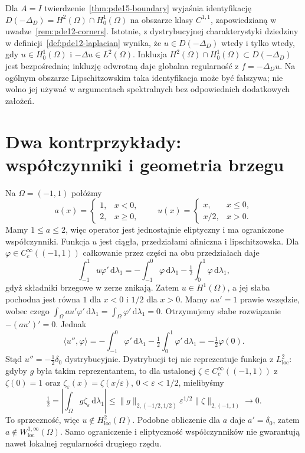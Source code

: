 \begin{uwaga}
Dla $A=I$ twierdzenie~\ref{thm:pde15-boundary}
wyjaśnia identyfikację $D(-\Delta_D)=H^2(\Omega)\cap
H_0^1(\Omega)$ na obszarze klasy $C^{1,1}$, zapowiedzianą
w uwadze~\ref{rem:pde12-corners}.
Istotnie, z dystrybucyjnej charakterystyki dziedziny
w definicji~\ref{def:pde12-laplacian} wynika, że
$u\in D(-\Delta_D)$ wtedy i tylko wtedy, gdy
$u\in H_0^1(\Omega)$ i $-\Delta u\in L^2(\Omega)$.
Inkluzja $H^2(\Omega)\cap H_0^1(\Omega)\subset D(-\Delta_D)$
jest bezpośrednia; inkluzję odwrotną daje globalna
regularność z $f=-\Delta_Du$.
Na ogólnym obszarze Lipschitzowskim taka identyfikacja
może być fałszywa; nie wolno jej używać w argumentach
spektralnych bez odpowiednich dodatkowych założeń.
\end{uwaga}

\section{Dwa kontrprzykłady: współczynniki i geometria brzegu}
\label{sec:pde15-counterexamples}
\begin{kontrprzyklad}
\label{ex:pde15-jump}
Na $\Omega=(-1,1)$ połóżmy
\[
 a(x)=\begin{cases}1,&x<0,\\2,&x\ge0,\end{cases}
 \qquad
 u(x)=\begin{cases}x,&x\le0,\\x/2,&x>0.\end{cases}
\]
Mamy $1\le a\le2$, więc operator jest jednostajnie
eliptyczny i ma ograniczone współczynniki.
Funkcja $u$ jest ciągła, przedziałami afiniczna
i lipschitzowska. Dla $\varphi\in C_c^\infty((-1,1))$
całkowanie przez części na obu przedziałach daje
\[
 \int_{-1}^1 u\varphi'\,\mathrm d\lambda_1
 =-\int_{-1}^0\varphi\,\mathrm d\lambda_1
  -\tfrac12\int_0^1\varphi\,\mathrm d\lambda_1,
\]
gdyż składniki brzegowe w zerze znikają.
Zatem $u\in H^1(\Omega)$, a jej słaba pochodna
jest równa $1$ dla $x<0$ i $1/2$ dla $x>0$.
Mamy $au'=1$ prawie wszędzie, wobec czego
$\int_\Omega au'\varphi'\,\mathrm d\lambda_1
=\int_\Omega\varphi'\,\mathrm d\lambda_1=0$.
Otrzymujemy słabe rozwiązanie $-(au')'=0$.
Jednak
\[
 \langle u'',\varphi\rangle
 =-\int_{-1}^0\varphi'\,\mathrm d\lambda_1
  -\tfrac12\int_0^1\varphi'\,\mathrm d\lambda_1
 =-\tfrac12\varphi(0).
\]
Stąd $u''=-\tfrac12\delta_0$ dystrybucyjnie.
Dystrybucji tej nie reprezentuje funkcja z $L^2_{\mathrm{loc}}$:
gdyby $g$ była takim reprezentantem, to dla ustalonej
$\zeta\in C_c^\infty((-1,1))$ z $\zeta(0)=1$
oraz $\zeta_\varepsilon(x)=\zeta(x/\varepsilon)$,
$0<\varepsilon<1/2$, mielibyśmy
\[
 \tfrac12
 =\left|\int_\Omega g\zeta_\varepsilon\,\mathrm d\lambda_1\right|
 \le \|g\|_{2,(-1/2,1/2)}\varepsilon^{1/2}
       \|\zeta\|_{2,(-1,1)}\longrightarrow0.
\]
To sprzeczność, więc $u\notin H^2_{\mathrm{loc}}(\Omega)$.
Podobne obliczenie dla $a$ daje $a'=\delta_0$,
zatem $a\notin W^{1,\infty}_{\mathrm{loc}}(\Omega)$.
Samo ograniczenie i eliptyczność współczynników
nie gwarantują nawet lokalnej regularności drugiego rzędu.
\end{kontrprzyklad}

